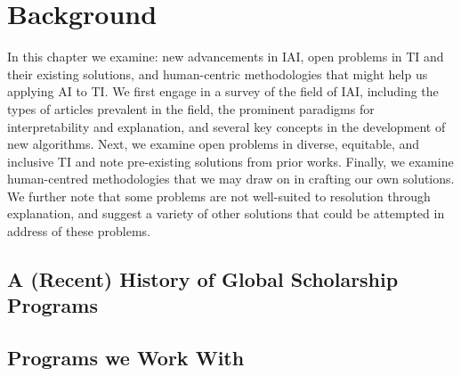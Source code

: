 



\chapter{\label{ch:background}Background} 
In this chapter we examine: new advancements in  IAI, open problems in TI and their existing solutions, and human-centric methodologies that might help us applying AI to TI. We first engage in a survey of the field of IAI, including the types of articles prevalent in the field, the prominent paradigms for interpretability and explanation, and several key concepts in the development of new algorithms. Next, we examine open problems in diverse, equitable, and inclusive TI and note pre-existing solutions from prior works. Finally, we examine human-centred methodologies that we may draw on in crafting our own solutions. We further note that some problems are not well-suited to resolution through explanation, and suggest a variety of other solutions that could be attempted in address of these problems.

\minitoc

\section{A (Recent) History of Global Scholarship Programs}
\section{Programs we Work With}\label{ssec:programs}
